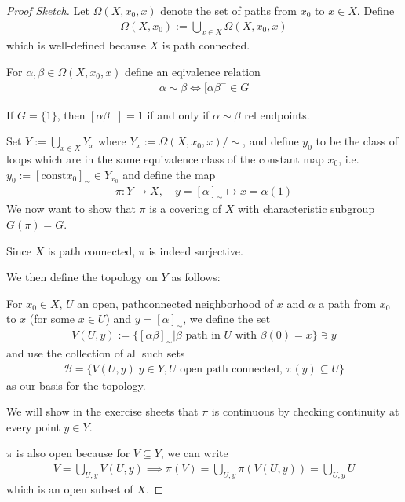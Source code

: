 \begin{proof}[Proof Sketch]
  Let $\Omega(X,x_0,x)$ denote the set of paths from $x_0$ to $x \in X$.
  Define
  \begin{align*}
    \Omega(X,x_0) := \bigcup_{x \in X}\Omega(X,x_0,x)
  \end{align*}
  which is well-defined because $X$ is path connected.

  For $\alpha, \beta \in \Omega(X,x_0,x)$ define an eqivalence relation 
  \begin{align*}
    \alpha \sim \beta \iff  [\alpha \beta^{-} \in G
  \end{align*}

  If $G = \{1\}$, then $[\alpha \beta^{-}] = 1$ if and only if $\alpha \sim \beta$ rel endpoints.

  Set $Y := \bigcup_{x \in X}Y_x$ where $Y_x := \Omega(X,x_0,x)/\sim$, and define $y_0$ to be the class of loops which are in the same equivalence class of the constant map $x_0$, i.e. $y_0 := [\text{const}x_0]_{\sim} \in Y_{x_0}$ and define the map
  \begin{align*}
    \pi:Y \to  X, \quad y= [\alpha]_{\sim} \mapsto  x = \alpha(1)
  \end{align*}
  We now want to show that $\pi$ is a covering of $X$ with characteristic subgroup $G(\pi) = G$.

  Since $X$ is path connected, $\pi$ is indeed surjective.

  We then define the topology on $Y$ as follows:

  For $x_0 \in X$, $U$ an open, pathconnected neighborhood of $x$ and $\alpha$ a path from $x_0$ to $x$ (for some $x \in U$) and $y = [\alpha]_{\sim}$, we define the set
  \begin{align*}
    V(U,y) := \{[\alpha \beta]_{\sim}\big\vert \beta \text{ path in $U$ with $\beta(0) = x$}\} \ni y
  \end{align*}
  and use the collection of all such sets
  \begin{align*}
    \mathcal{B} = \{V(U,y) \big\vert y \in Y, U \text{ open path connected, } \pi(y) \subseteq U\}
  \end{align*}
  as our basis for the topology.

  We will show in the exercise sheets that $\pi$ is continuous by checking continuity at every point $y \in Y$.

  $\pi$ is also open because for $V \subseteq Y$, we can write
  \begin{align*}
    V = \bigcup_{U, y} V(U,y) \implies \pi(V) = \bigcup_{U,y} \pi(V(U,y)) = \bigcup_{U,y} U
  \end{align*}
  which is an open subset of $X$.

\end{proof}
